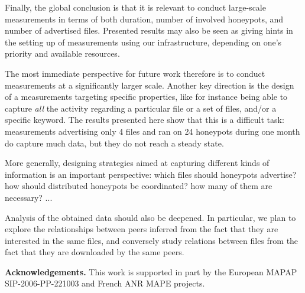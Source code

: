 \documentclass[final,
notitlepage,
narroweqnarray,
	inline,
	twoside,
]{ieee}
\begin{document}
Finally, the global conclusion is that it is relevant to conduct large-scale measurements in terms of both duration, number of involved honeypots, and number of advertised files.
Presented results may also be seen as giving hints in the setting up of measurements using our infrastructure, depending on one's priority and available resources.

The most immediate perspective for future work therefore is to conduct measurements at a significantly larger scale.
Another key direction is the design of a measurements targeting specific properties, like for instance being able to capture {\em all} the activity regarding a particular file or a set of files, and/or a specific keyword. The results presented here show that this is a difficult task: measurements advertising only 4 files and ran on 24 honeypots during one month do capture much data, but they do not reach a steady state.

More generally, designing strategies aimed at capturing different kinds of information is an important perspective: which files should honeypots advertise? how should distributed honeypots be coordinated? how many of them are necessary? ...

Analysis of the obtained data should also be deepened. In particular, we plan to explore the relationships between peers inferred from the fact that they are interested in the same files, and conversely study relations between files from the fact that they are downloaded by the same peers.

\smallskip
\noindent
{\bf Acknowledgements.}
This work is supported in part by the European MAPAP SIP-2006-PP-221003 and
French ANR MAPE projects.
 


\end{document}
